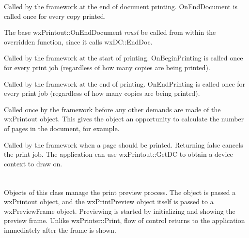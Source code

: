 \label{wxprintoutonenddocument}


Called by the framework at the end of document printing. OnEndDocument
is called once for every copy printed.

The base wxPrintout::OnEndDocument {\it must} be called
from within the overridden function, since it calls wxDC::EndDoc.

\label{wxprintoutonbeginprinting}


Called by the framework at the start of printing. OnBeginPrinting is called once for every
print job (regardless of how many copies are being printed).

\label{wxprintoutonendprinting}


Called by the framework at the end of printing. OnEndPrinting
is called once for every print job (regardless of how many copies are being printed).

\label{wxprintoutonprepareprinting}


Called once by the framework before any other demands are made of the
wxPrintout object. This gives the object an opportunity to calculate the
number of pages in the document, for example.

\label{wxprintoutonprintpage}


Called by the framework when a page should be printed. Returning false cancels
the print job. The application can use wxPrintout::GetDC to obtain a device
context to draw on.

\section{}\label{wxprintpreview}

Objects of this class manage the print preview process. The object is passed
a wxPrintout object, and the wxPrintPreview object itself is passed to
a wxPreviewFrame object. Previewing is started by initializing and showing
the preview frame. Unlike wxPrinter::Print, flow of control returns to the application
immediately after the frame is shown.


